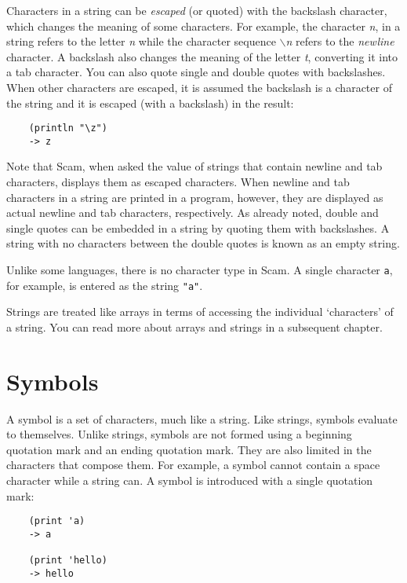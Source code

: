Characters in a string can be {\it escaped} (or quoted)
with the backslash character,
which changes the meaning of some characters. For example, the character
{\it n}, in a string refers to the letter {\it n} while the character sequence
{\it $\backslash$n}
refers
to the {\it newline} character. A backslash also changes the meaning of the
letter {\it t},
converting it into a tab character.
You can also quote single and double quotes with backslashes.
When other characters are escaped,
it is assumed the backslash is a character of the
string and it is escaped (with a backslash) in the result:

\begin{verbatim}
    (println "\z")
    -> z
\end{verbatim}

Note that Scam, when asked
the value of strings that contain newline and tab characters, displays
them as escaped characters. When newline and tab characters in a string
are printed in a program, however, they are displayed as actual newline
and tab characters, respectively.
As already noted,
double and single quotes can be embedded in a
string by quoting them with backslashes. A string with no characters
between the double quotes is known as an empty string.

Unlike some languages, there is no character type in Scam. A single
character {\verb+a+}, for example, is entered as the string
{\verb+"a"+}.

Strings are treated like arrays in terms of accessing the individual
`characters' of a string. You can read more about arrays and strings
in a subsequent chapter.

\section{Symbols}

A symbol is a set of characters, much like a string. Like strings,
symbols evaluate to themselves. Unlike strings,
symbols are not formed using a beginning quotation mark and an
ending quotation mark. They are also limited
in the characters that compose them. For example, a symbol cannot
contain a space character while a string can. A symbol is introduced
with a single quotation mark:

\begin{verbatim}
    (print 'a)
    -> a

    (print 'hello)
    -> hello
\end{verbatim}


